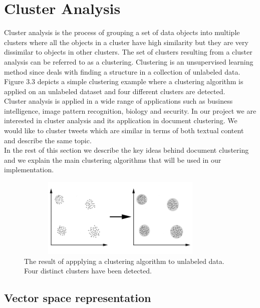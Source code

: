 \section{Cluster Analysis}

Cluster analysis is the process of grouping a set of data objects into multiple clusters where all the
objects in a cluster have high similarity but they are very dissimilar to objects in other clusters. The set
of clusters resulting from a cluster analysis can be referred to as a clustering. Clustering is an unsupervised 
learning method since deals with finding a structure in a collection of unlabeled data. Figure 3.3 depicts a simple 
clustering example where a clustering algorithm is applied on an unlabeled dataset and four different clusters are detected.\\
Cluster analysis is applied in a wide range of applications such as business intelligence, image pattern recognition, biology and 
security. In our project we are interested in cluster analysis and its application in document clustering. We would like to cluster tweets 
which are similar in terms of both textual content and describe the same topic.\\
In the rest of this section we describe the key ideas behind document clustering and we explain the main clustering algorithms that
will be used in our implementation.

\begin{figure}[!htbp]
  \begin{center}
    \includegraphics[height=1.5in, width=4in]{clustering}
    \caption{The result of appplying a clustering algorithm to unlabeled data. Four distinct clusters have been detected.}
    \label{ClusteringExample}
  \end{center}
\end{figure} 

\subsection{Vector space representation}

